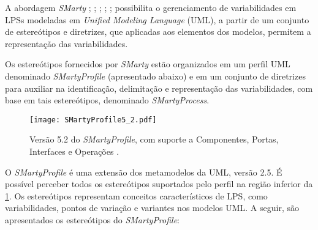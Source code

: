 \label{sec:Abordagem_SMarty}

A abordagem \textit{SMarty} \cite{BeraICEIS2015}; \cite{GeraldiICEIS2015}; \cite{MarcolinoEtAl2014}; \cite{MarcolinoICEIS2014}; \cite{MarcolinoSEKE2013}; \cite{OliveiraJuniorJUCS2010} possibilita o gerenciamento de variabilidades em LPSs modeladas em \textit{Unified Modeling Language} (UML), a partir de um conjunto de estereótipos e diretrizes, que aplicadas aos elementos dos modelos, permitem a representação das variabilidades.

Os estereótipos fornecidos por \textit{SMarty} estão organizados em um perfil UML denominado \textit{SMartyProfile} (apresentado abaixo) e em um conjunto de diretrizes para auxiliar na identificação, delimitação e representação das variabilidades, com base em tais estereótipos, denominado \textit{SMartyProcess}.

\begin{landscape}
	\begin{figure}[]
		\centering		
		\caption{Versão 5.2 do \textit{SMartyProfile}, com suporte a Componentes, Portas, Interfaces e Operações \cite{Bera2015}.}	
		\label{SMartyProfile}
		\texttt{[image: SMartyProfile5\_2.pdf]}
	\end{figure}	
\end{landscape}

O \textit{SMartyProfile} é uma extensão dos metamodelos da UML, versão 2.5. É possível perceber todos os estereótipos suportados pelo perfil na região inferior da \ref{SMartyProfile}. Os estereótipos representam conceitos característicos de LPS, como variabilidades, pontos de variação e variantes nos modelos UML. A seguir, são apresentados os estereótipos do \textit{SMartyProfile}:

